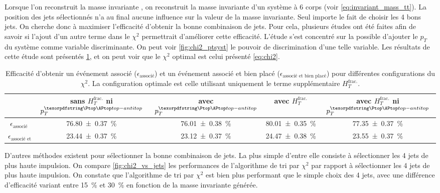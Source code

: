 Lorsque l'on reconstruit la masse invariante \ttbar, on reconstruit la masse invariante d'un système à 6 corps (voir \cref{eq:invariant_mass_tt}). La position des jets sélectionnés n'a au final aucune influence sur la valeur de la masse invariante. Seul importe le fait de choisir les 4 bons jets. On cherche donc à maximiser l'efficacité d'obtenir la bonne combinaison de jets. Pour cela, plusieurs études ont été faites afin de savoir si l'ajout d'un autre terme dans le $\chi^2$ permettrait d'améliorer cette efficacité. L'étude s'est concentré sur la possible d'ajouter le $p_T$ du système \ttbar comme variable discriminante. On peut voir \cref{fig:chi2_ptsyst} le pouvoir de discrimination d'une telle variable. Les résultats de cette étude sont présentés \cref{tab:chi2_study}, et on peut voir que le $\chi^2$ optimal est celui présenté \cref{eq:chi2}.

\begin{table}[h] \centering
    \begin{tabular}{@{}ccccc@{}} \toprule
        & sans $H_{T}^{\text{frac.}}$ ni $p_{T}^{\ttbar}$ & avec $p_{T}^{\ttbar}$ & avec $H_{T}^{\text{frac.}}$ & avec $H_{T}^{\text{frac.}}$ ni $p_{T}^{\ttbar}$ \\ \midrule
        $\epsilon_\text{associé}$ & \SI{76.80 \pm 0.37}{\%} & \SI{76.01 \pm 0.38}{\%} & \SI{80.01 \pm 0.35}{\%} & \SI{77.35 \pm 0.37}{\%} \\
        $\epsilon_\text{associé et bien placé}$ & \SI{23.44 \pm 0.37}{\%} & \SI{23.12 \pm 0.37}{\%} & \SI{24.47 \pm 0.38}{\%} & \SI{23.55 \pm 0.37}{\%} \\ \bottomrule
    \end{tabular}
    \caption{Efficacité d'obtenir un événement associé ($\epsilon_\text{associé}$) et un événement associé et bien placé ($\epsilon_\text{associé et bien placé}$) pour différentes configurations du $\chi^2$. La configuration optimale est celle utilisant uniquement le terme supplémentaire $H_{T}^{\text{frac.}}$.}
    \label{tab:chi2_study}
\end{table}

D'autres méthodes existent pour sélectionner la bonne combinaison de jets. La plus simple d'entre elle consiste à sélectionner les 4 jets de plus haute impulsion. On compare \cref{fig:chi2_vs_jets} les performances de l'algorithme de tri par $\chi^2$ par rapport à sélectionner les 4 jets de plus haute impulsion. On constate que l'algorithme de tri par $\chi^2$ est bien plus performant que le simple choix des 4 jets, avec une différence d'efficacité variant entre \tilde\SI{15}{\%} et \tilde\SI{30}{\%} en fonction de la masse invariante \ttbar générée.

